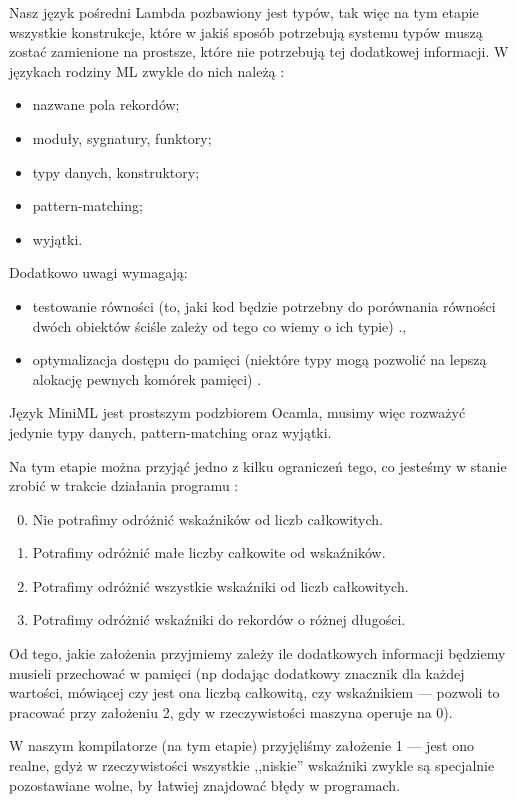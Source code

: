 \documentclass[11pt]{scrartcl}
\begin{document}
Nasz język pośredni Lambda pozbawiony jest typów, tak więc na tym etapie
wszystkie konstrukcje, które w jakiś sposób potrzebują systemu typów muszą
zostać zamienione na prostsze, które nie potrzebują tej dodatkowej informacji.
W językach rodziny ML zwykle do nich należą \cite{Appel4}:
\begin{itemize}
\item nazwane pola rekordów;
\item moduły, sygnatury, funktory;
\item typy danych, konstruktory;
\item pattern-matching;
\item wyjątki.
\end{itemize}
Dodatkowo uwagi wymagają:
\begin{itemize}
\item testowanie równości (to, jaki kod będzie potrzebny do porównania
  równości dwóch obiektów ściśle zależy od tego co wiemy o ich typie)
  \cite{Appel4.3}.,
\item optymalizacja dostępu do pamięci (niektóre typy mogą pozwolić na lepszą alokację
  pewnych komórek pamięci) \cite{Appel4.4}.
\end{itemize}

Język MiniML jest prostszym podzbiorem Ocamla, musimy więc rozważyć jedynie typy
danych, pattern-matching oraz wyjątki.

Na tym etapie można przyjąć jedno z kilku ograniczeń tego, co jesteśmy w stanie
zrobić w trakcie działania programu \cite{Appel4.1}:
\begin{enumerate}
\setcounter{enumi}{-1}
\item Nie potrafimy odróżnić wskaźników od liczb całkowitych.
\item Potrafimy odróżnić małe liczby całkowite od wskaźników.
\item Potrafimy odróżnić wszystkie wskaźniki od liczb całkowitych.
\item Potrafimy odróżnić wskaźniki do rekordów o różnej długości.
\end{enumerate}
Od tego, jakie założenia przyjmiemy zależy ile dodatkowych informacji będziemy
musieli przechować w pamięci (np dodając dodatkowy znacznik dla każdej wartości,
mówiącej czy jest ona liczbą całkowitą, czy wskaźnikiem --- pozwoli to pracować
przy założeniu 2, gdy w rzeczywistości maszyna operuje na 0).

W naszym kompilatorze (na tym etapie) przyjęliśmy założenie 1 --- jest ono realne,
gdyż w rzeczywistości wszystkie ,,niskie'' wskaźniki zwykle są specjalnie
pozostawiane wolne, by łatwiej znajdować błędy w programach.
\end{document}
